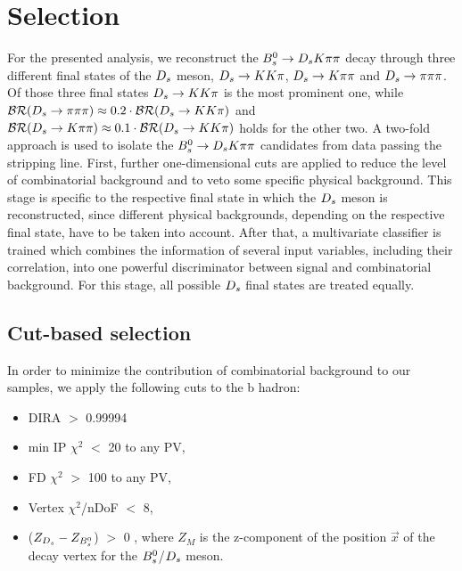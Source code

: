 
\section{Selection}
\label{sec:Selection}

For the presented analysis, we reconstruct the ${{B}^0_{s}}\rightarrow{\ensuremath{{D}_{s}}}{\ensuremath{K}}{\ensuremath{\pi}}{\ensuremath{\pi}}$ decay through three different final states of the ${{D}_{s}}$ meson, ${{D}_{s}}\rightarrow{\ensuremath{K}}{\ensuremath{K}}{\ensuremath{\pi}}$, ${{D}_{s}}\rightarrow{\ensuremath{K}}{\ensuremath{\pi}}{\ensuremath{\pi}}$ and ${{D}_{s}}\rightarrow{\ensuremath{\pi}}{\ensuremath{\pi}}{\ensuremath{\pi}}$.
Of those three final states ${{D}_{s}}\rightarrow{\ensuremath{K}}{\ensuremath{K}}{\ensuremath{\pi}}$ is the most prominent one,
 while $\mathcal{BR}({{D}_{s}}\rightarrow{\ensuremath{\pi}}{\ensuremath{\pi}}{\ensuremath{\pi}}) \approx 0.2\cdot\mathcal{BR}({{D}_{s}}\rightarrow{\ensuremath{K}}{\ensuremath{K}}{\ensuremath{\pi}})$ and $\mathcal{BR}({{D}_{s}}\rightarrow{\ensuremath{K}}{\ensuremath{\pi}}{\ensuremath{\pi}}) \approx 0.1\cdot\mathcal{BR}({{D}_{s}}\rightarrow{\ensuremath{K}}{\ensuremath{K}}{\ensuremath{\pi}})$ holds for the other two. \newline
A two-fold approach is used to isolate the ${{B}^0_{s}}\rightarrow{\ensuremath{{D}_{s}}}{\ensuremath{K}}{\ensuremath{\pi}}{\ensuremath{\pi}}$ candidates from data passing the stripping line. 
First, further one-dimensional cuts are applied to reduce the level of combinatorial background and to veto some specific physical background. 
This stage is specific to the respective final state in which the ${{D}_{s}}$ meson is reconstructed, since different physical backgrounds, depending on the respective final state, have to be taken into account.   
After that, a multivariate classifier is trained which combines the information of several input variables, including their correlation, into one powerful discriminator
between signal and combinatorial background. For this stage, all possible ${{D}_{s}}$ final states are treated equally. 

\subsection{Cut-based selection}

In order to minimize the contribution of combinatorial background to our samples, we apply the following cuts to the b hadron:

\begin{itemize}

\item DIRA $>$ 0.99994

\item min IP $\chi^{2}$ $<$ 20 to any PV,

\item FD $\chi^{2}$ $>$ 100 to any PV,

\item Vertex $\chi^{2}$/nDoF $<$ 8,

\item ($Z_{{{D}_{s}}}-Z_{{{B}^0_{s}}}$) $>$ 0 , where $Z_{M}$ is the z-component of the position $\vec{x}$ of the decay vertex for the ${{B}^0_{s}}$/${{D}_{s}}$ meson.

\end{itemize}    


